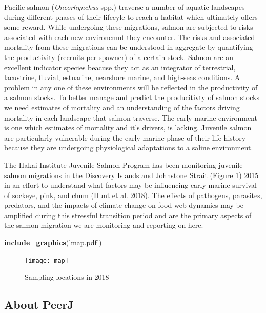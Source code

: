 \documentclass[fleqn,10pt,lineno]{wlpeerj} %
\newenvironment{Shaded}{\begin{snugshade}}{\end{snugshade}}
\newcommand{\KeywordTok}[1]{\textcolor[rgb]{0.13,0.29,0.53}{\textbf{#1}}}
\newcommand{\StringTok}[1]{\textcolor[rgb]{0.31,0.60,0.02}{#1}}
\newcommand{\NormalTok}[1]{#1}
\theoremstyle{definition}
\theoremstyle{definition}
\theoremstyle{definition}
\theoremstyle{remark}
\begin{document}
Pacific salmon (\emph{Oncorhynchus} spp.) traverse a number of aquatic
landscapes during different phases of their lifecyle to reach a habitat
which ultimately offers some reward. While undergoing these migrations,
salmon are subjected to risks associated with each new environemnt they
encounter. The risks and associated mortality from these migrations can
be understood in aggregate by quantifying the productivity (recruits per
spawner) of a certain stock. Salmon are an excellent indicator species
beacuse they act as an integrator of terrestrial, lacustrine, fluvial,
estuarine, nearshore marine, and high-seas conditions. A problem in any
one of these environments will be reflected in the productivity of a
salmon stocks. To better manage and predict the producitivty of salmon
stocks we need estimates of mortality and an understanding of the
factors driving mortality in each landscape that salmon traverse. The
early marine environment is one which estimates of mortality and it's
drivers, is lacking. Juvenile salmon are particularly vulnerable during
the early marine phase of their life history because they are undergoing
physiological adaptations to a saline environment.

The Hakai Institute Juvenile Salmon Program has been monitoring juvenile
salmon migrations in the Discovery Islands and Johnstone Strait (Figure
\ref{fig:map}) 2015 in an effort to understand what factors may be
influencing early marine survival of sockeye, pink, and chum (Hunt et
al. 2018). The effects of pathogens, parasites, predators, and the
impacts of climate change on food web dynamics may be amplified during
this stressful transition period and are the primary aspects of the
salmon migration we are monitoring and reporting on here.

\begin{Shaded}
\begin{Highlighting}[]
\KeywordTok{include_graphics}\NormalTok{(}\StringTok{'map.pdf'}\NormalTok{)}
\end{Highlighting}
\end{Shaded}

\begin{figure}

\texttt{[image: map]} \hfill{}

\caption{Sampling locations in 2018}\label{fig:map}
\end{figure}

\subsection*{About PeerJ}\label{about-peerj}
\end{document}
